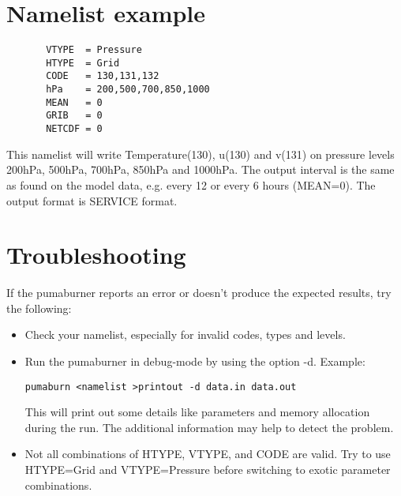 \section{Namelist example}
\begin{verbatim}
       VTYPE  = Pressure
       HTYPE  = Grid
       CODE   = 130,131,132
       hPa    = 200,500,700,850,1000
       MEAN   = 0
       GRIB   = 0
       NETCDF = 0
\end{verbatim}

    This namelist will write Temperature(130), u(130) and v(131)
    on pressure levels 200hPa, 500hPa, 700hPa, 850hPa and 1000hPa.
    The output interval is the same as found on the model data,
    e.g. every 12 or every 6 hours (MEAN=0). The output format
    is SERVICE format.

\section{Troubleshooting}
If the pumaburner reports an error or doesn't produce 
the expected results, try the following:

\begin{itemize}

\item Check your namelist, especially for invalid codes, types and levels.

\item Run the pumaburner in debug-mode by using the option -d.
Example:
\begin{verbatim}
pumaburn <namelist >printout -d data.in data.out
\end{verbatim}

This will print out some details like parameters and memory allocation
during the run. The additional information may help to detect
the problem.

\item Not all combinations of HTYPE, VTYPE, and CODE are valid.
Try to use HTYPE=Grid and VTYPE=Pressure before switching to
exotic parameter combinations.

\end{itemize}

